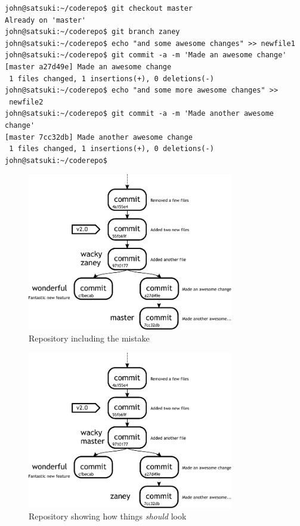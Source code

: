\begin{Verbatim}
john@satsuki:~/coderepo$ git checkout master
Already on 'master'
john@satsuki:~/coderepo$ git branch zaney
john@satsuki:~/coderepo$ echo "and some awesome changes" >> newfile1
john@satsuki:~/coderepo$ git commit -a -m 'Made an awesome change'
[master a27d49e] Made an awesome change
 1 files changed, 1 insertions(+), 0 deletions(-)
john@satsuki:~/coderepo$ echo "and some more awesome changes" >> 
 newfile2
john@satsuki:~/coderepo$ git commit -a -m 'Made another awesome change'
[master 7cc32db] Made another awesome change
 1 files changed, 1 insertions(+), 0 deletions(-)
john@satsuki:~/coderepo$ 
\end{Verbatim}

\begin{figure}[hbt]
\centering
\includegraphics[width=9cm]{images/f-w4-d3.pdf}
\caption{Repository including the mistake}
\end{figure}

\begin{figure}[hbt]
\centering
\includegraphics[width=9cm]{images/f-w4-d4.pdf}
\caption{Repository showing how things \emph{should} look}
\end{figure}

